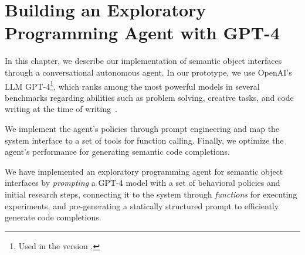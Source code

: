 
\chapter{Building an Exploratory Programming Agent with GPT-4}
\label{cha:agent}

In this chapter, we describe our implementation of semantic object interfaces through a conversational autonomous agent.
In our prototype, we use OpenAI's LLM GPT-4\footnote{Used in the version .}, which ranks among the most powerful models in several benchmarks regarding abilities such as problem solving, creative tasks, and code writing at the time of writing~\cite{borji2023battle,chiang2024chatbot}.

We implement the agent's policies through prompt engineering and map the system interface to a set of tools for function calling.
Finally, we optimize the agent's performance for generating semantic code completions.



\begin{summary}
	We have implemented an exploratory programming agent for semantic object interfaces by \emph{prompting} a GPT-4 model with a set of behavioral policies and initial research steps, connecting it to the system through \emph{functions} for executing experiments, and pre-generating a statically structured prompt to efficiently generate code completions.
\end{summary}
